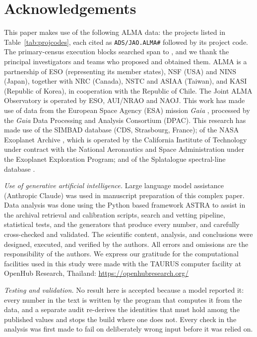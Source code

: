 \section*{Acknowledgements}
This paper makes use of the following ALMA data: the \NProjCodes{} projects
listed in Table~\ref{tab:projcodes}, each cited as \texttt{ADS/JAO.ALMA\#}
followed by its project code. The \NEB{} primary-census execution blocks
searched span \PrEbDateFirst{} to \PrEbDateLast{}, and we thank the principal
investigators and teams who proposed and obtained
them.\ProjCodeUnresClause{} ALMA is a partnership of ESO
(representing its member states), NSF (USA) and NINS (Japan), together with NRC
(Canada), NSTC and ASIAA (Taiwan), and KASI (Republic of Korea), in cooperation
with the Republic of Chile. The Joint ALMA Observatory is operated by ESO,
AUI/NRAO and NAOJ. This work has made use of data from the European Space
Agency (ESA) mission {\it Gaia} \citep{GaiaDR3}, processed by the {\it Gaia}
Data Processing and Analysis Consortium (DPAC). This research has made use
of the SIMBAD database \citep{SIMBAD2000} (CDS, Strasbourg, France); of the
NASA Exoplanet Archive \citep{NEA2013}, which is operated by the California
Institute of Technology under contract with the National Aeronautics and
Space Administration under the Exoplanet Exploration Program; and of the
Splatalogue spectral-line database \citep{Splatalogue2007}.

\emph{Use of generative artificial intelligence.} Large language model
assistance (Anthropic Claude) was used in manuscript preparation of this
complex paper. Data analysis was done using the Python based framework ASTRA
\citep[][\href{https://arxiv.org/abs/2610.36144}{https://\allowbreak arxiv.org/\allowbreak abs/}]{White2026ASTRA}
to assist in the archival retrieval and calibration scripts, search and
vetting pipeline, statistical tests, and the generators that produce every
number, and carefully cross-checked and validated. The scientific content,
analysis, and conclusions were designed, executed, and verified by the
authors. All errors and omissions are the responsibility of the authors. We express our gratitude for the computational facilities used in this
study were made with the TAURUS computer facility at OpenHub Research,
Thailand: \href{https://openhubresearch.org/}{https://\allowbreak openhubresearch.org/}

\emph{Testing and validation.} No result here is accepted because a model
reported it: every number in the text is written by the program that computes it from the
data, and a separate audit re-derives the identities that must hold among the
published values and stops the build where one does not. Every check in the
analysis was first made to fail on deliberately wrong input before it was
relied on.

